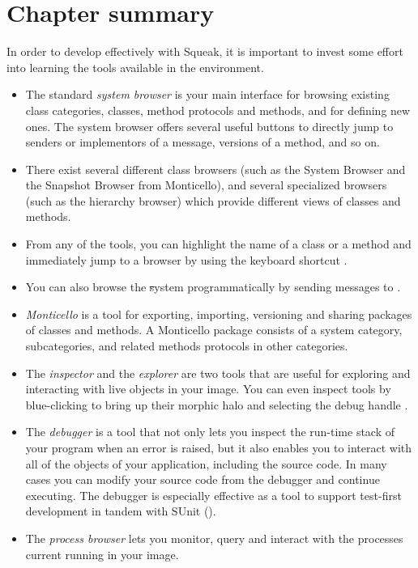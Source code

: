 \documentclass[a4paper,10pt,twoside]{book}
\begin{document}
\section{Chapter summary}

In order to develop effectively with Squeak, it is important to invest some effort into learning the tools available in the environment.

\begin{itemize}
  \item The standard \emph{system browser} is your main interface for browsing existing class categories, classes, method protocols and methods, and for defining new ones.
  The system browser offers several useful buttons to directly jump to senders or implementors of a message, versions of a method, and so on.
  \item There exist several different class browsers (such as the System Browser and the Snapshot Browser from Monticello), and several specialized browsers (such as the hierarchy browser) which provide different views of classes and methods.
  \item From any of the tools, you can highlight the name of a class or a method and immediately jump to a browser by using the keyboard shortcut .
  \item You can also browse the \st system programmatically by sending messages to .
  \item \emph{Monticello} is a tool for exporting, importing, versioning and sharing packages of classes and methods.
  A Monticello package consists of a system category, subcategories, and related methods protocols in other categories.
  \item The \emph{inspector} and the \emph{explorer} are two tools that are useful for exploring and interacting with live objects in your image.
  You can even inspect tools by blue-clicking to bring up their morphic halo and selecting the debug handle \debugHandle.
  \item The \emph{debugger} is a tool that not only lets you inspect the run-time stack of your program when an error is raised, but it also enables you to interact with all of the objects of your application, including the source code. In many cases you can modify your source code from the debugger and continue executing. The debugger is especially effective as a tool to support test-first development in tandem with SUnit ().
  \item The \emph{process browser} lets you monitor, query and interact with the processes current running in your image.

\end{itemize}
\end{document}
